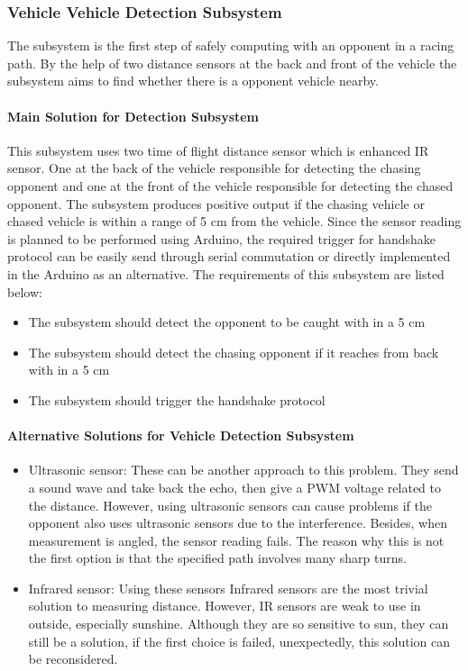 \documentclass[a4paper,12pt]{article}
\begin{document}
	\subsubsection{Vehicle Vehicle Detection Subsystem}
	
		The subsystem is the first step of safely computing with an opponent in a racing path. By the help of two distance sensors at the back and front of the vehicle the subsystem aims to find whether there is a opponent vehicle nearby.
	
	\paragraph{Main Solution for  Detection Subsystem}
	
	 This subsystem uses two time of flight distance sensor which is enhanced IR sensor. One at the back of the vehicle responsible for detecting the chasing opponent and one at the front of the vehicle responsible for detecting the chased opponent. The subsystem produces positive output if the chasing vehicle or chased vehicle is within a range of 5 cm from the vehicle. Since the sensor reading is planned to be performed using Arduino, the required trigger for handshake protocol can be  easily send through serial commutation or directly implemented in the Arduino as an alternative. The requirements of this subsystem are listed below:
	
	\begin{itemize}
		\item The subsystem should detect the opponent to be caught with in a 5 cm 
		\item The subsystem should detect the chasing opponent if it reaches from back with in a 5 cm 
		\item The subsystem should trigger the handshake protocol 
	\end{itemize}
	
	\paragraph{Alternative Solutions for Vehicle Detection Subsystem}
	\begin{itemize}
		\item {Ultrasonic sensor:} These can be another approach to this problem. They send a sound wave and take back the echo, then give a PWM voltage related to the distance. However, using ultrasonic sensors can cause problems if the opponent also uses ultrasonic sensors due to the interference. Besides, when measurement is angled, the sensor reading fails. The reason why this is not the first option is that the specified path involves many sharp turns.
		
		\item {Infrared sensor:} Using these sensors Infrared sensors are the most trivial solution to measuring distance. However, IR sensors are weak to use in outside, especially sunshine. Although they are so sensitive to sun, they can still be a solution, if the first choice is failed, unexpectedly, this solution can be reconsidered.
	\end{itemize}
	
\end{document}
